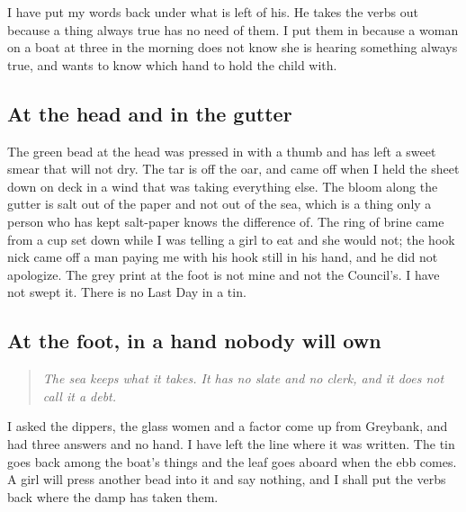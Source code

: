 \documentclass{design/chronicle}
\begin{document}
I have put my words back under what is left of his. He takes the verbs out because a thing always true has no need of them. I put them in because a woman on a boat at three in the morning does not know she is hearing something always true, and wants to know which hand to hold the child with.

\subsection*{At the head and in the gutter}

The green bead at the head was pressed in with a thumb and has left a sweet smear that will not dry. The tar is off the oar, and came off when I held the sheet down on deck in a wind that was taking everything else. The bloom along the gutter is salt out of the paper and not out of the sea, which is a thing only a person who has kept salt-paper knows the difference of. The ring of brine came from a cup set down while I was telling a girl to eat and she would not; the hook nick came off a man paying me with his hook still in his hand, and he did not apologize. The grey print at the foot is not mine and not the Council’s. I have not swept it. There is no Last Day in a tin.

\subsection*{At the foot, in a hand nobody will own}

\begin{quote}\itshape The sea keeps what it takes. It has no slate and no clerk, and it does not call it a debt.\end{quote}

I asked the dippers, the glass women and a factor come up from Greybank, and had three answers and no hand. I have left the line where it was written. The tin goes back among the boat’s things and the leaf goes aboard when the ebb comes. A girl will press another bead into it and say nothing, and I shall put the verbs back where the damp has taken them.
\end{document}
